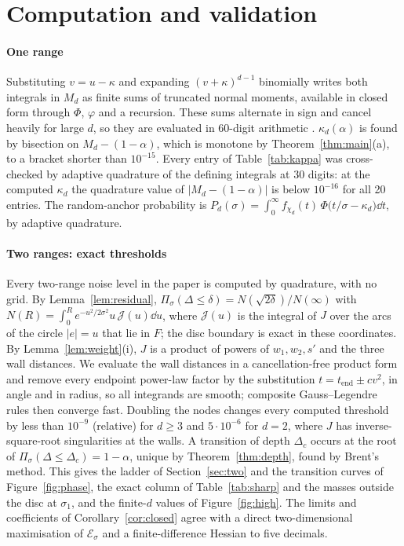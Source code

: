 \section{Computation and validation}\label{app:comp}

\paragraph{One range} Substituting $v = u - \kappa$ and expanding $(v + \kappa)^{d-1}$ binomially writes both integrals
in $M_d$ as finite sums of truncated normal moments, available in closed form through $\Phi$, $\varphi$ and a recursion.
These sums alternate in sign and cancel heavily for large $d$, so they are evaluated in 60-digit arithmetic
\citep{mpmath}.
$\kappa_d(\alpha)$ is found by bisection on $M_d - (1 - \alpha)$, which is monotone by Theorem~\ref{thm:main}(a), to a
bracket shorter than $10^{-15}$. Every entry of Table~\ref{tab:kappa} was cross-checked by adaptive quadrature of the
defining integrals at 30 digits: at the computed $\kappa_d$ the quadrature value of $|M_d - (1 - \alpha)|$ is below
$10^{-16}$ for all 20 entries. The random-anchor probability is
$P_d(\sigma) = \int_0^\infty f_{\chi_d}(t)\,\Phi\bigl(t/\sigma - \kappa_d\bigr)\dd t$, by adaptive quadrature.

\paragraph{Two ranges: exact thresholds} Every two-range noise level in the paper is computed by quadrature, with no
grid. By Lemma~\ref{lem:residual}, $\Pi_\sigma(\Delta \le \delta) = N(\sqrt{2\delta})/N(\infty)$ with
$N(R) = \int_0^R e^{-u^2/2\sigma^2}u\,\mathcal J(u)\dd u$, where $\mathcal J(u)$ is the integral of $J$ over the arcs of the circle
$|e| = u$ that lie in $F$; the disc boundary is exact in these coordinates. By Lemma~\ref{lem:weight}(i), $J$ is a
product of powers of $w_1, w_2, s'$ and the three wall distances. We evaluate the wall distances in a cancellation-free
product form and remove every endpoint power-law factor by the substitution $t = t_{\mathrm{end}} \pm cv^2$, in angle and in
radius, so all integrands are smooth; composite Gauss--Legendre rules then converge fast. Doubling the nodes changes
every computed threshold by less than $10^{-9}$ (relative) for $d \ge 3$ and $5\cdot10^{-6}$ for $d = 2$, where $J$ has
inverse-square-root singularities at the walls. A transition of depth $\Delta_c$ occurs at the root of
$\Pi_\sigma(\Delta \le \Delta_c) = 1 - \alpha$, unique by Theorem~\ref{thm:depth}, found by Brent's method. This gives the
ladder of Section~\ref{sec:two} and the transition curves of Figure~\ref{fig:phase}, the exact column of
Table~\ref{tab:sharp} and the masses outside the disc at $\sigma_1$, and the finite-$d$ values of Figure~\ref{fig:high}. The
limits and coefficients of Corollary~\ref{cor:closed} agree with a direct two-dimensional maximisation of $\mathcal E_\sigma$
and a finite-difference Hessian to five decimals.

